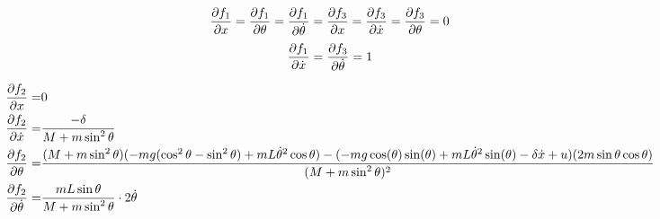 \documentclass[]{article}
\begin{document}
\begin{equation*}
	\pdv{f_1}{x}  = \pdv{f_1}{\theta} = \pdv{f_1}{\dot{\theta}} = 	\pdv{f_3}{x}  =	\pdv{f_3}{\dot{x}} = \pdv{f_3}{\theta} = 0 
\end{equation*}
\begin{equation*}
	 \pdv{f_1}{\dot{x}} = \pdv{f_3}{\dot{\theta}}  = 1
\end{equation*}


\begin{eqnarray*}
	\pdv{f_2}{x} = & 0 \\
	\pdv{f_2}{\dot{x}} =&  \frac{-\delta}{M + m \sin^2 \theta} \\
	\pdv{f_2}{\theta} =  & \frac{(M+ m \sin^2 \theta)(-mg(\cos^2 \theta - \sin^2 \theta)+mL\dot{\theta}^2 \cos \theta)-(-mg \cos(\theta)\sin(\theta) + mL{\dot{\theta}}^2 \sin(\theta)-\delta \dot{x}+u)(2m \sin \theta \cos \theta)}{(M + m \sin^2 \theta)^2} \\
	\pdv{f_2}{\dot{\theta}} = & \frac{mL\sin \theta}{M + m \sin^2 \theta} \cdot 2 \dot{\theta}
\end{eqnarray*}
\end{document}
